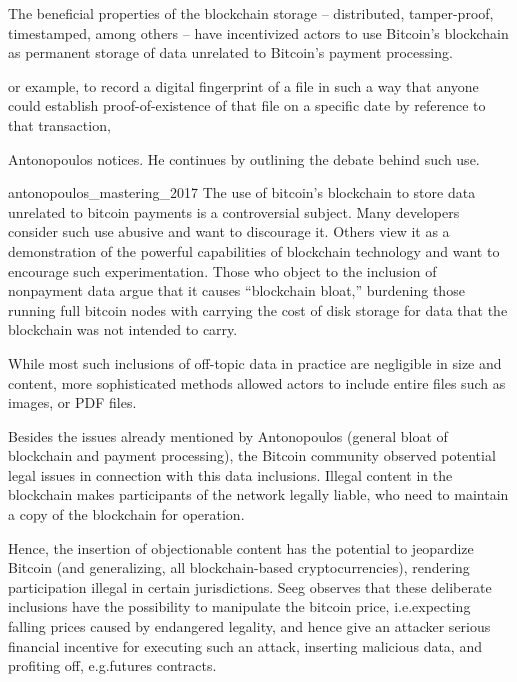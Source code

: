 \documentclass[a4paper,11pt,titlepage]{scrbook}
\begin{document}
The beneficial properties of the blockchain storage – distributed, tamper-proof, timestamped, among others – have incentivized actors to use Bitcoin's blockchain as permanent storage of data unrelated to Bitcoin's payment processing.
\begin{displayquote}
    or example, to record a digital fingerprint
    of a file in such a way that anyone could establish proof-of-existence of that file on a specific date by reference to that transaction,
\end{displayquote}
Antonopoulos notices. He continues by outlining the debate behind such use.
\begin{displaycquote}{antonopoulos_mastering_2017}
    The use of bitcoin’s blockchain to store data unrelated to bitcoin payments is a controversial subject.
    Many developers consider such use abusive and want to discourage it.
    Others view it as a demonstration of the powerful capabilities of blockchain technology and want to encourage such experimentation. Those who object to the inclusion of nonpayment data argue that it causes \enquote{blockchain bloat,} burdening those running full bitcoin nodes with carrying the cost of disk storage for data that the blockchain was not intended to carry.
\end{displaycquote}
While most such inclusions of off-topic data in practice are negligible in size and content, more sophisticated methods allowed actors to include entire files such as images, or PDF files. \cite{matzutt_quantitative_2018}

Besides the issues already mentioned by Antonopoulos (general bloat of blockchain and payment processing), the Bitcoin community observed potential legal issues in connection with this data inclusions. \cite[See][]{bitcoinwiki_weaknesses_2011}
Illegal content in the blockchain makes participants of the network legally liable, who need to maintain a copy of the blockchain for operation.

Hence, the insertion of objectionable content has the potential to jeopardize Bitcoin (and generalizing, all blockchain-based cryptocurrencies), rendering participation illegal in certain jurisdictions.
Seeg observes that these deliberate inclusions have the possibility to manipulate the bitcoin price, i.e.\@ expecting falling prices caused by endangered legality, and hence give an attacker serious financial incentive for executing such an attack, inserting malicious data, and profiting off, e.g.\@ futures contracts. \cite[1--2]{seeg_hardening_2018}
\end{document}
